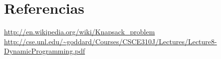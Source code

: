 \documentclass[preprint]{elsarticle}
\begin{document}
\pagebreak
\section{Referencias}
  \begingroup
  \renewcommand{\section}[2]{}
  \begin{thebibliography}{9}
     \url{http://en.wikipedia.org/wiki/Knapsack_problem}
     \url{http://cse.unl.edu/~goddard/Courses/CSCE310J/Lectures/Lecture8-DynamicProgramming.pdf}
  \end{thebibliography}
  \endgroup
\end{document}
